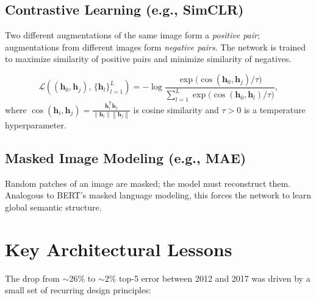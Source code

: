 \documentclass[11pt, oneside]{book}
\newcommand{\norm}[1]{\left\lVert #1 \right\rVert}
\newcommand{\T}{^{\mathsf{T}}}
\newcommand{\loss}{\mathcal{L}}
\newcommand{\hvec}{\mathbf{h}}
\begin{document}
\subsection{Contrastive Learning (e.g., SimCLR)}

Two different augmentations of the same image form a \emph{positive pair};
augmentations from different images form \emph{negative pairs}.
The network is trained to maximize similarity of positive pairs and
minimize similarity of negatives.

\begin{thmbox}[title={InfoNCE Loss (NT-Xent)}]
\[
  \loss\!\left((\hvec_0, \hvec_j),\, \{\hvec_l\}_{l=1}^L\right)
  = -\log \frac{\exp\!\bigl(\cos(\hvec_0,\hvec_j)/\tau\bigr)}
               {\sum_{l=1}^{L} \exp\!\bigl(\cos(\hvec_0,\hvec_l)/\tau\bigr)},
\]
where $\cos(\hvec_i,\hvec_j) = \frac{\hvec_i\T \hvec_j}{\norm{\hvec_i}\norm{\hvec_j}}$
is cosine similarity and $\tau > 0$ is a temperature hyperparameter.
\end{thmbox}

\subsection{Masked Image Modeling (e.g., MAE)}

Random patches of an image are masked; the model must reconstruct them.
Analogous to BERT's masked language modeling, this forces the network to learn
global semantic structure.

\section{Key Architectural Lessons}

The drop from $\sim$26\% to $\sim$2\% top-5 error between 2012 and 2017
was driven by a small set of recurring design principles:
\end{document}
